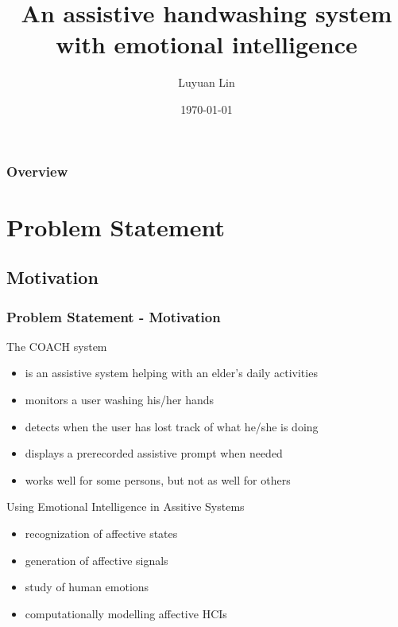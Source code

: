 \documentclass{beamer}
\title[Master Thesis Presentation]{An assistive handwashing system with emotional intelligence}
\author{Luyuan Lin} %
\institute[UWaterloo] %
{
University of Waterloo \\ %
\medskip
\textit{Supervisor:
\newline Jesse Hoey
} %
}
\date{\today} %
\begin{document}
\begin{frame}
\titlepage %
\end{frame}

\begin{frame}
\frametitle{Overview} %
\tableofcontents %
\end{frame}


\section{Problem Statement} 
\subsection{Motivation}
\begin{frame}
\frametitle{Problem Statement - Motivation}
The COACH system
\begin{itemize}
\item is an assistive system helping with an elder's daily activities
\item monitors a user washing his/her hands
\item detects when the user has lost track of what he/she is doing
\item displays a prerecorded assistive prompt when needed
\item works well for some persons, but not as well for others
\end{itemize}
\pause
\vspace{0.3cm}
Using Emotional Intelligence in Assitive Systems
\begin{itemize}
\pause \item recognization of affective states
\pause \item generation of affective signals
\pause \item study of human emotions
\pause \item computationally modelling affective HCIs
\end{itemize}
\end{frame}
\end{document}
